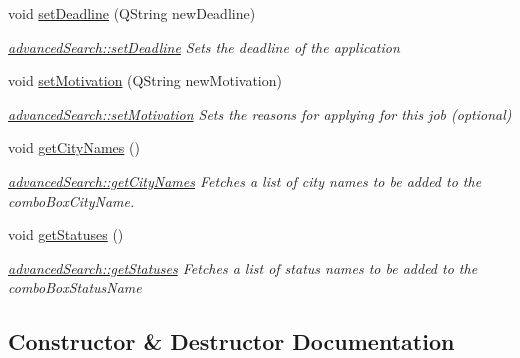 \begin{DoxyCompactItemize}
void \mbox{\hyperlink{classadvanced_search_aeaacf5b995f4169c38d4381e17bc0969}{set\+Deadline}} (Q\+String new\+Deadline)
\begin{DoxyCompactList}\small\item\em \mbox{\hyperlink{classadvanced_search_aeaacf5b995f4169c38d4381e17bc0969}{advanced\+Search\+::set\+Deadline}} Sets the deadline of the application \end{DoxyCompactList}\item 
void \mbox{\hyperlink{classadvanced_search_a72e3b5ac068d875070165e865a03410c}{set\+Motivation}} (Q\+String new\+Motivation)
\begin{DoxyCompactList}\small\item\em \mbox{\hyperlink{classadvanced_search_a72e3b5ac068d875070165e865a03410c}{advanced\+Search\+::set\+Motivation}} Sets the reasons for applying for this job (optional) \end{DoxyCompactList}\item 
\mbox{\label{classadvanced_search_a459fba94afcef2073b4cd706e454d38f}} 
void \mbox{\hyperlink{classadvanced_search_a459fba94afcef2073b4cd706e454d38f}{get\+City\+Names}} ()
\begin{DoxyCompactList}\small\item\em \mbox{\hyperlink{classadvanced_search_a459fba94afcef2073b4cd706e454d38f}{advanced\+Search\+::get\+City\+Names}} Fetches a list of city names to be added to the combo\+Box\+City\+Name. \end{DoxyCompactList}\item 
\mbox{\label{classadvanced_search_a1517ebc5651f4956e26f8aa055983c58}} 
void \mbox{\hyperlink{classadvanced_search_a1517ebc5651f4956e26f8aa055983c58}{get\+Statuses}} ()
\begin{DoxyCompactList}\small\item\em \mbox{\hyperlink{classadvanced_search_a1517ebc5651f4956e26f8aa055983c58}{advanced\+Search\+::get\+Statuses}} Fetches a list of status names to be added to the combo\+Box\+Status\+Name \end{DoxyCompactList}\end{DoxyCompactItemize}


\subsection{Constructor \& Destructor Documentation}
\mbox{\label{classadvanced_search_ae9e0253869871c6af23d804fdc78d184}} 
